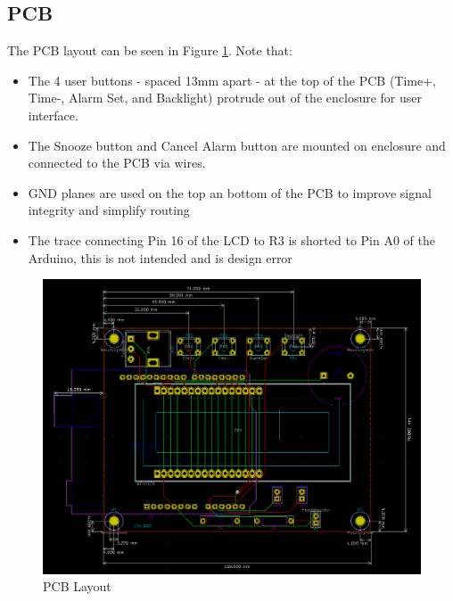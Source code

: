 \documentclass{article}
\begin{document}
\subsection{PCB}
The PCB layout can be seen in Figure \ref{fig:layout}. Note that:
\begin{itemize}
    \item The 4 user buttons - spaced 13mm apart - at the top of the PCB (Time+, Time-, Alarm Set, and Backlight) protrude out of the enclosure for user interface.
    \item The Snooze button and Cancel Alarm button are mounted on enclosure and connected to the PCB via wires.
    \item GND planes are used on the top an bottom of the PCB to improve signal integrity and simplify routing
    \item The trace connecting Pin 16 of the LCD to R3 is shorted to Pin A0 of the Arduino, this is not intended and is design error
\end{itemize}
\begin{figure}[H]
    \centering
    \includegraphics[width=\textwidth]{pcb_layout.png}
    \caption{PCB Layout}
    \label{fig:layout}
\end{figure}
\end{document}
